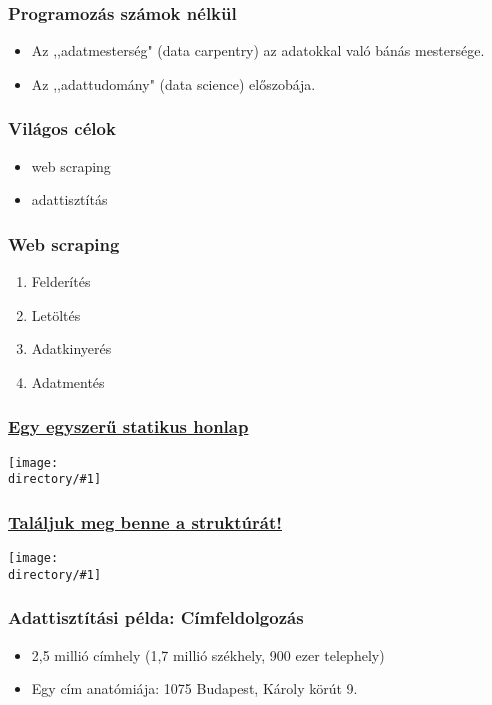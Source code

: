 \documentclass[aspectratio=169,compress,mathserif]{beamer}
\newcommand{\directory}{./exhibits}
\newcommand{\widefigure}[2]{\begin{frame}\frametitle{\hyperlink{#1back}{#2}}\hypertarget{#1}{{\begin{center}\texttt{[image: \\directory/\#1]}\end{center}}}\end{frame}}
\begin{document}
\begin{frame}\frametitle{Programozás számok nélkül}\hypertarget{Programozás számok nélkül}{}
\begin{itemize}
\item Az ,,adatmesterség" (data carpentry) az adatokkal való bánás mestersége.

\item Az ,,adattudomány" (data science) előszobája.


\end{itemize}
\end{frame}



\begin{frame}\frametitle{Világos célok}\hypertarget{Világos célok}{}
\begin{itemize}
\item web scraping

\item adattisztítás






\end{itemize}
\end{frame}



\begin{frame}\frametitle{Web scraping}\hypertarget{Web scraping}{}
\begin{enumerate}\setcounter{enumi}{0}
\item Felderítés

\item Letöltés

\item Adatkinyerés

\item Adatmentés


\end{enumerate}
\end{frame}




\widefigure{scraping1}{Egy egyszerű statikus honlap}
\widefigure{scraping2}{Találjuk meg benne a struktúrát!}


\begin{frame}\frametitle{Adattisztítási példa: Címfeldolgozás}\hypertarget{Adattisztítási példa: Címfeldolgozás}{}
\begin{itemize}
\item 2,5 millió címhely (1,7 millió székhely, 900 ezer telephely)

\item Egy cím anatómiája: 1075 Budapest, Károly körút 9.




\end{itemize}
\end{frame}
\end{document}

